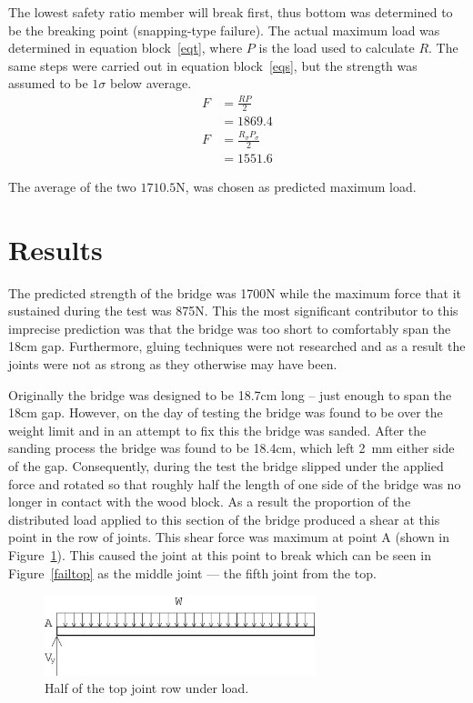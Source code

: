 \documentclass[12pt]{article}
\begin{document}
		The lowest safety ratio member will break first, thus bottom was determined to be the breaking point (snapping-type failure). The actual maximum load was determined in equation block~\ref{eqt}, where $P$ is the load used to calculate $R$. The same steps were carried out in equation block~\ref{eqs}, but the strength was assumed to be $1\sigma$ below average.
		\begin{subequations}
			\begin{align}
				F&=\frac{R P}{2} \\
				&=1869.4
			\end{align}
			\label{eqt}
		\end{subequations}
		\begin{subequations}
			\begin{align}
				F&=\frac{R_{\sigma} P_{\sigma}}{2} \\
				&=1551.6
			\end{align}
			\label{eqs}
		\end{subequations}

		The average of the two $1710.5\mathrm{N}$, was chosen as predicted maximum load.
	\section{Results}
The predicted strength of the bridge was 1700N while the maximum force that it sustained during the test was 875N. This the most significant contributor to this imprecise prediction was that the bridge was too short to comfortably span the 18cm gap. Furthermore, gluing techniques were not researched and as a result the joints were not as strong as they otherwise may have been.

Originally the bridge was designed to be 18.7cm long – just enough to span the 18cm gap. However, on the day of testing the bridge was found to be over the weight limit and in an attempt to fix this the bridge was sanded. After the sanding process the bridge was found to be 18.4cm, which left 2~mm either side of the gap. Consequently, during the test the bridge slipped under the applied force and rotated so that roughly half the length of one side of the bridge was no longer in contact with the wood block. As a result the proportion of the distributed load applied to this section of the bridge produced a shear at this point in the row of joints. This shear force was maximum at point A (shown in Figure~\ref{loadtop}). This caused the joint at this point to break which can be seen in Figure~\ref{failtop} as the middle joint --- the fifth joint from the top.
		\begin{figure}[h!]
			\centering
			\includegraphics[width=0.7\textwidth]{loadtop}
			\caption{Half of the top joint row under load.}
			\label{loadtop}
		\end{figure}
\end{document}
